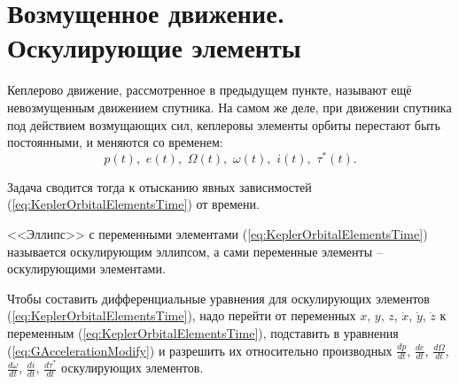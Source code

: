 \section{Возмущенное движение. Оскулирующие элементы}
\noindent\indent Кеплерово движение, рассмотренное в предыдущем пункте, называют
ещё невозмущенным движением спутника. На самом же деле, при движении спутника под
действием возмущающих сил, кеплеровы элементы орбиты перестают быть постоянными,
и меняются со временем:
\begin{equation} \label{eq:KeplerOrbitalElementsTime}
  p(t),\,\, e(t),\,\, \Omega(t),\,\, \omega(t),\,\, i(t),\,\, \tau^*(t).
\end{equation}\par
Задача сводится тогда к отысканию явных зависимостей (\ref{eq:KeplerOrbitalElementsTime})
от времени.\par
<<Эллипс>> с переменными элементами (\ref{eq:KeplerOrbitalElementsTime}) называется
оскулирующим эллипсом, а сами переменные элементы -- оскулирующими элементами.\par
Чтобы составить дифференциальные уравнения для оскулирующих элементов (\ref{eq:KeplerOrbitalElementsTime}),
надо перейти от переменных $x$, $y$, $z$, $\dot{x}$, $\dot{y}$, $\dot{z}$ к переменным
(\ref{eq:KeplerOrbitalElementsTime}), подставить в уравнения (\ref{eq:GAccelerationModify})
и разрешить их относительно производных $\frac{dp}{dt}$, $\frac{de}{dt}$, $\frac{d\Omega}{dt}$,
$\frac{d\omega}{dt}$, $\frac{di}{dt}$, $\frac{d\tau^*}{dt}$ оскулирующих элементов.
